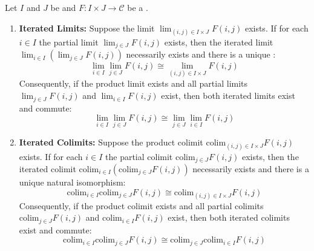 \begin{theorem} \label{theorem:limits_commute_with_limits_and_colimits_commute_with_colimits}
Let $I$ and $J$ be  and $F: I \times J \to \mathcal{C}$ be a .

\begin{enumerate}
    \item \textbf{Iterated Limits:}
    Suppose the  limit $\lim_{(i, j) \in I \times J} F(i, j)$ exists. If for each $i \in I$ the partial limit $\lim_{j \in J} F(i, j)$ exists, then the iterated limit $\lim_{i \in I} (\lim_{j \in J} F(i, j))$ necessarily exists and there is a unique :
    \begin{equation}
        \lim_{i \in I} \lim_{j \in J} F(i, j) \cong \lim_{(i, j) \in I \times J} F(i, j)
    \end{equation}
    Consequently, if the product limit exists and all partial limits $\lim_{j \in J} F(i, j)$ and $\lim_{i \in I} F(i, j)$ exist, then both iterated limits exist and commute:
    \begin{equation}
        \lim_{i \in I} \lim_{j \in J} F(i, j) \cong \lim_{j \in J} \lim_{i \in I} F(i, j)
    \end{equation}

    \item \textbf{Iterated Colimits:} 
    Suppose the product colimit $\text{colim}_{(i, j) \in I \times J} F(i, j)$ exists. If for each $i \in I$ the partial colimit $\text{colim}_{j \in J} F(i, j)$ exists, then the iterated colimit $\text{colim}_{i \in I} (\text{colim}_{j \in J} F(i, j))$ necessarily exists and there is a unique natural isomorphism:
    \begin{equation}
        \text{colim}_{i \in I} \text{colim}_{j \in J} F(i, j) \cong \text{colim}_{(i, j) \in I \times J} F(i, j)
    \end{equation}
    Consequently, if the product colimit exists and all partial colimits $\text{colim}_{j \in J} F(i, j)$ and $\text{colim}_{i \in I} F(i, j)$ exist, then both iterated colimits exist and commute:
    \begin{equation}
        \text{colim}_{i \in I} \text{colim}_{j \in J} F(i, j) \cong \text{colim}_{j \in J} \text{colim}_{i \in I} F(i, j)
    \end{equation}
\end{enumerate}
\end{theorem}